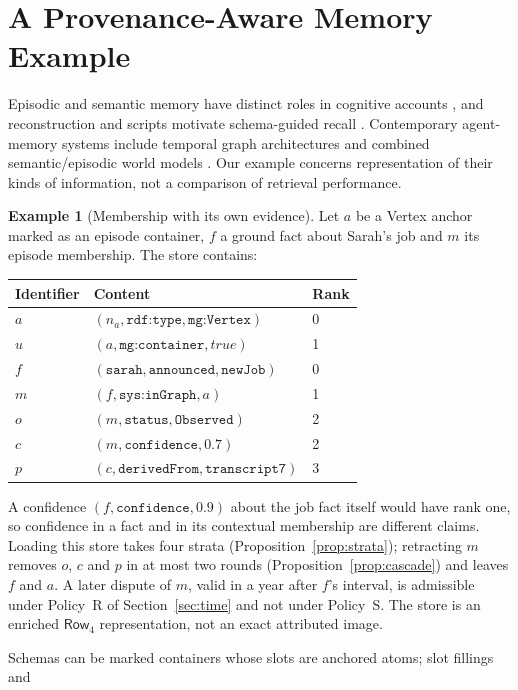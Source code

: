 \documentclass[11pt]{article}
\theoremstyle{plain}
\theoremstyle{definition}
\newtheorem{example}{Example}
\theoremstyle{remark}
\newcommand{\mg}[1]{\texttt{mg:#1}}
\newcommand{\sys}[1]{\texttt{sys:#1}}
\newcommand{\iri}[1]{\texttt{#1}}
\newcommand{\NF}[1]{\mathsf{Row}_{#1}}
\begin{document}
\section{A Provenance-Aware Memory Example}\label{sec:memory}
Episodic and semantic memory have distinct roles in cognitive accounts
\cite{tulving1972episodic}, and reconstruction and scripts motivate schema-guided recall
\cite{bartlett1932remembering,schank1977scripts}. Contemporary agent-memory systems
include temporal graph architectures and combined semantic/episodic world models
\cite{rasmussen2025zep,anokhin2024arigraph}. Our example concerns representation of their
kinds of information, not a comparison of retrieval performance.

\begin{example}[Membership with its own evidence]\label{ex:episode}
Let $a$ be a Vertex anchor marked as an episode container, $f$ a ground fact about Sarah's
job and $m$ its episode membership. The store contains:
\begin{center}\small
\begin{tabular}{lll}
\toprule
Identifier & Content & Rank\\
\midrule
$a$ & $(n_a,\iri{rdf:type},\mg{Vertex})$ & 0\\
$u$ & $(a,\mg{container},\mathit{true})$ & 1\\
$f$ & $(\iri{sarah},\iri{announced},\iri{newJob})$ & 0\\
$m$ & $(f,\sys{inGraph},a)$ & 1\\
$o$ & $(m,\iri{status},\iri{Observed})$ & 2\\
$c$ & $(m,\iri{confidence},0.7)$ & 2\\
$p$ & $(c,\iri{derivedFrom},\iri{transcript7})$ & 3\\
\bottomrule
\end{tabular}
\end{center}
A confidence $(f,\iri{confidence},0.9)$ about the job fact itself would have rank one, so
confidence in a fact and in its contextual membership are different claims. Loading this
store takes four strata (Proposition~\ref{prop:strata}); retracting $m$ removes $o$, $c$
and $p$ in at most two rounds (Proposition~\ref{prop:cascade}) and leaves $f$ and $a$. A
later dispute of $m$, valid in a year after $f$'s interval, is admissible under Policy~R of
Section~\ref{sec:time} and not under Policy~S. The store is an enriched $\NF4$
representation, not an exact attributed image.
\end{example}
Schemas can be marked containers whose slots are anchored atoms; slot fillings and
\end{document}
